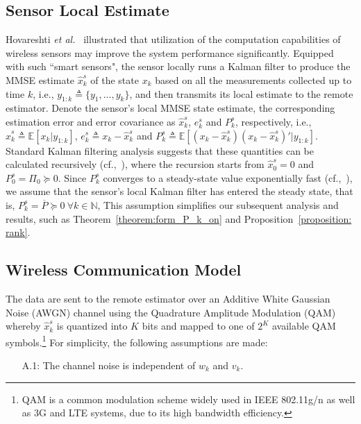 \documentclass[twocolumn]{autart}    \usepackage{cite}
\begin{document}
{\subsection{Sensor Local Estimate} \label{sec:local-state-estimate}
Hovareshti \textit{et al.}~\cite{hovareshti2007sensor} illustrated that utilization of the computation capabilities of wireless sensors may improve the system performance significantly.
Equipped with such
``smart sensors", the sensor locally runs a Kalman filter to produce the MMSE
estimate $\hat{x}_k^s$ of the state $x_k$ based on all the measurements
collected up to time $k$, i.e., $y_{1:k}\triangleq\{y_1,...,y_k\}$, and then
transmits its local estimate to the remote estimator.
Denote the sensor's local MMSE state estimate, the corresponding estimation error and error covariance as $\hat{x}_k^s$, $e^s_k$ and $P_k^s$, respectively, i.e., $\hat{x}_k^s\triangleq\mathbb{E}[x_k|y_{1:k}]$, $e_k^s\triangleq x_k-\hat{x}_k^s$ and ${P}_k^s\triangleq\mathbb{E}[(x_k-\hat{x}_k^s)(x_k-\hat{x}_k^s)'|y_{1:k}]$.
Standard Kalman filtering analysis suggests that
 these quantities can be calculated recursively (cf.,~\cite{andmoo79}),
where the recursion starts from $\hat{x}_{0}^s = 0$ and $P_0^s = \Pi_0\succeq0$.
Since $P_k^s$
converges to a steady-state value exponentially fast (cf.,~\cite{andmoo79}), we assume that the sensor's local Kalman filter has entered the steady state, that is,
$  P_k^s = \overline{P}\succeq 0~\forall k \in \mathbb{N}$,
{This assumption
simplifies our subsequent analysis and results, such as Theorem~\ref{theorem:form_P_k_on} and
Proposition~\ref{proposition: rank}.}


\subsection{Wireless Communication Model}


The data are sent to the remote estimator over
an Additive White Gaussian Noise (AWGN) channel using the Quadrature Amplitude Modulation
(QAM) whereby $\hat x_k^s$ is
quantized into $K$ bits and mapped to one of $2^K$ available QAM
symbols.\footnote{QAM is a common modulation scheme  widely used in IEEE 802.11g/n as well
as 3G and LTE systems, due to its high bandwidth efficiency.} For simplicity, the following assumptions are made:
\vspace{-3mm}
\begin{enumerate}
\item[A.1:]
The channel noise is independent of $w_k$ and $v_k$.


\end{enumerate}}
\end{document}
